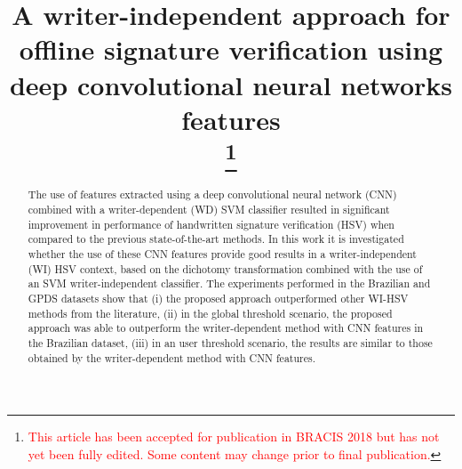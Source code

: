 \documentclass[conference]{IEEEtran}
\begin{document}
\title{A writer-independent approach for offline signature verification using deep convolutional neural networks features\\
\thanks{\textcolor{red}{ This article has been accepted for publication in BRACIS 2018 but has not yet been fully edited. Some content may change prior to final publication.}}
}


\author{
\and
{}
\and
{}






}


\maketitle


\begin{abstract}
The use of features extracted using a deep convolutional neural network (CNN) combined with a writer-dependent (WD) SVM classifier resulted in significant improvement in performance of handwritten signature verification (HSV) when compared to the previous state-of-the-art methods. In this work it is investigated whether the use of these CNN features provide good results in a writer-independent (WI) HSV context, based on the dichotomy transformation combined with the use of an SVM writer-independent classifier. The experiments performed in the Brazilian and GPDS datasets show that (i) the proposed approach outperformed other WI-HSV methods from the literature, (ii) in the global threshold scenario, the proposed approach was able to outperform the writer-dependent method with CNN features in  the Brazilian dataset, (iii) in an user threshold scenario, the results are similar to those obtained by the writer-dependent method with CNN features.
\end{abstract}
\end{document}
